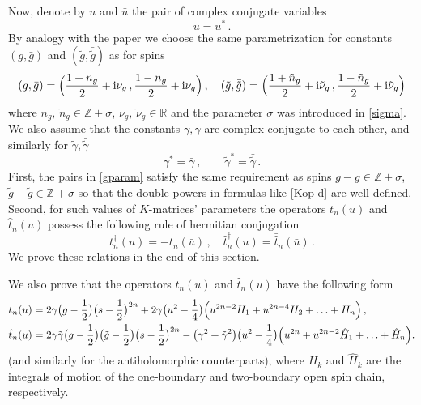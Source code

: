 \documentclass[a4paper,11pt]{article}
\renewcommand{\imath}{\mathrm{i}}
\numberwithin{equation}{section}
\begin{document}
Now, denote by $u$ and $\bar{u}$ the pair of complex conjugate variables
\begin{equation} \nonumber
	\bar{u} = u^\ast \,.
\end{equation}
By analogy with the paper \cite{ADV2} we choose the same parametrization for constants $(g,\bar{g})$ and $(\tilde{g},\bar{\tilde{g}})$ as for spins
\begin{equation} \label{gparam}
	(g, \bar{g}) = \Bigl(\frac{1+n_g}{2} + \imath\nu_g \,, \frac{1-n_g}{2} + \imath\nu_g \Bigr) \,, \quad
	(\tilde{g}, \bar{\tilde{g}}) = \Bigl(\frac{1+\tilde{n}_g}{2} + \imath\tilde{\nu}_g \,, \frac{1-\tilde{n}_g}{2} + \imath\tilde{\nu}_g \Bigr)
\end{equation}
where $n_g,\,\tilde{n}_g \in \mathbb{Z}+\sigma $, $\nu_g,\,\tilde{\nu}_g \in \mathbb{R}$ and the parameter $\sigma$ was introduced in \eqref{sigma}.
We also assume that the constants $\gamma,\bar{\gamma}$ are complex conjugate to each other, and similarly for $\tilde{\gamma},\bar{\tilde{\gamma}}$
\begin{equation} \nonumber
	\gamma^\ast = \bar{\gamma} \,, \qquad
	\tilde{\gamma}^\ast = \bar{\tilde{\gamma}} \,.
\end{equation}
First, the pairs in \eqref{gparam} satisfy the same requirement as spins $g-\bar{g} \in \mathbb{Z}+\sigma$, $\tilde{g}-\bar{\tilde{g}} \in \mathbb{Z}+\sigma$ so that the double powers in formulas like \eqref{Kop-d} are well defined.
Second, for such values of $K$-matrices' parameters the operators $t_n(u)$ and $\hat{t}_n(u)$ possess the following rule of hermitian conjugation
\begin{equation} \label{tconj}
	t_n^\dagger(u) = - \bar{t}_n(\bar{u}) \,, \quad \hat{t}_n^\dagger(u) = \bar{\hat{t}}_n(\bar{u}) \,.
\end{equation}
We prove these relations in the end of this section.

We also prove that the operators $t_n(u)$ and $\hat{t}_n(u)$ have the following form 
\begin{align}
	& \nonumber
	t_n(u) = 2\gamma\bigl(g-\frac{1}{2}\bigr)\bigl(s-\frac{1}{2}\bigr)^{2n}+2\gamma\bigl(u^2-\frac{1}{4}\bigr)\Bigl(u^{2n-2}H_1+u^{2n-4}H_2+\ldots+H_n\Bigr) \,,\\
	& \label{xn}
	\hat{t}_n(u) = 2\gamma\tilde{\gamma}\bigl(g-\frac{1}{2}\bigr)\bigl(\tilde{g}-\frac{1}{2}\bigr)\bigl(s-\frac{1}{2}\bigr)^{2n}-\bigl(\gamma^2+\tilde{\gamma}^2\bigr)\bigl(u^2-\frac{1}{4}\bigr)\Bigl(u^{2n}+u^{2n-2}\hat{H}_1+\ldots+\hat{H}_n\Bigr).
\end{align}
(and similarly for the antiholomorphic counterparts),
where $H_k$ and $\hat{H}_k$ are the integrals of motion of the one-boundary and two-boundary open spin chain, respectively. 
\end{document}
